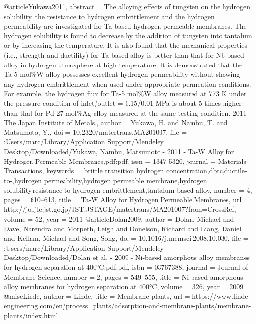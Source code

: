 @article{Yukawa2011,
abstract = {The alloying effects of tungsten on the hydrogen solubility, the resistance to hydrogen embrittlement and the hydrogen permeability are investigated for Ta-based hydrogen permeable membranes. The hydrogen solubility is found to decrease by the addition of tungsten into tantalum or by increasing the temperature. It is also found that the mechanical properties (i.e., strength and ductility) for Ta-based alloy is better than that for Nb-based alloy in hydrogen atmosphere at high temperature. It is demonstrated that the Ta-5 mol{\%}W alloy possesses excellent hydrogen permeability without showing any hydrogen embrittlement when used under appropriate permeation conditions. For example, the hydrogen flux for Ta-5 mol{\%}W alloy measured at 773 K under the pressure condition of inlet/outlet = 0.15/0.01 MPa is about 5 times higher than that for Pd-27 mol{\%}Ag alloy measured at the same testing condition. {\textcopyright}2011 The Japan Institute of Metals.},
author = {Yukawa, H. and Nambu, T. and Matsumoto, Y.},
doi = {10.2320/matertrans.MA201007},
file = {:Users/marc/Library/Application Support/Mendeley Desktop/Downloaded/Yukawa, Nambu, Matsumoto - 2011 - Ta-W Alloy for Hydrogen Permeable Membranes.pdf:pdf},
issn = {1347-5320},
journal = {Materials Transactions},
keywords = {brittle transition hydrogen concentration,dbtc,ductile-to-,hydrogen permeability,hydrogen permeable membrane,hydrogen solubility,resistance to hydrogen embrittlement,tantalum-based alloy},
number = {4},
pages = {610--613},
title = {{Ta-W Alloy for Hydrogen Permeable Membranes}},
url = {http://joi.jlc.jst.go.jp/JST.JSTAGE/matertrans/MA201007?from=CrossRef},
volume = {52},
year = {2011}
}
@article{Dolan2009,
author = {Dolan, Michael and Dave, Narendra and Morpeth, Leigh and Donelson, Richard and Liang, Daniel and Kellam, Michael and Song, Song},
doi = {10.1016/j.memsci.2008.10.030},
file = {:Users/marc/Library/Application Support/Mendeley Desktop/Downloaded/Dolan et al. - 2009 - Ni-based amorphous alloy membranes for hydrogen separation at 400°C.pdf:pdf},
isbn = {03767388},
journal = {Journal of Membrane Science},
number = {2},
pages = {549--555},
title = {{Ni-based amorphous alloy membranes for hydrogen separation at 400°C}},
volume = {326},
year = {2009}
}
@misc{Linde,
author = {Linde},
title = {{Membrane plants}},
url = {https://www.linde-engineering.com/en/process{\_}plants/adsorption-and-membrane-plants/membrane-plants/index.html}
}
